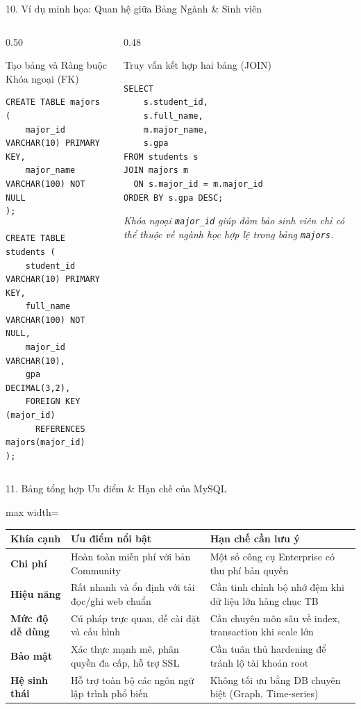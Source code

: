 \documentclass[aspectratio=169,11pt]{beamer}
\newcommand{\kw}[1]{\textcolor{dbblue}{\textbf{#1}}}
\begin{document}
\begin{frame}[fragile]{10. Ví dụ minh họa: Quan hệ giữa Bảng Ngành \& Sinh viên}
\begin{columns}[t]
  \begin{column}{0.50\textwidth}
    \begin{block}{Tạo bảng và Ràng buộc Khóa ngoại (FK)}
\begin{lstlisting}
CREATE TABLE majors (
    major_id VARCHAR(10) PRIMARY KEY,
    major_name VARCHAR(100) NOT NULL
);

CREATE TABLE students (
    student_id VARCHAR(10) PRIMARY KEY,
    full_name VARCHAR(100) NOT NULL,
    major_id VARCHAR(10),
    gpa DECIMAL(3,2),
    FOREIGN KEY (major_id) 
      REFERENCES majors(major_id)
);
\end{lstlisting}
    \end{block}
  \end{column}
  \begin{column}{0.48\textwidth}
    \begin{block}{Truy vấn kết hợp hai bảng (JOIN)}
\begin{lstlisting}
SELECT 
    s.student_id,
    s.full_name,
    m.major_name,
    s.gpa
FROM students s
JOIN majors m 
  ON s.major_id = m.major_id
ORDER BY s.gpa DESC;
\end{lstlisting}
    \end{block}
    \scriptsize
    \textit{Khóa ngoại \texttt{major\_id} giúp đảm bảo sinh viên chỉ có thể thuộc về ngành học hợp lệ trong bảng \texttt{majors}.}
  \end{column}
\end{columns}
\end{frame}

\begin{frame}{11. Bảng tổng hợp Ưu điểm \& Hạn chế của MySQL}
\centering
\begin{adjustbox}{max width=\textwidth}
\footnotesize
\begin{tabular}{p{2.6cm}p{5.8cm}p{5.8cm}}
\toprule
\textbf{Khía cạnh} & \textbf{Ưu điểm nổi bật} & \textbf{Hạn chế cần lưu ý} \\
\midrule
\kw{Chi phí} & Hoàn toàn miễn phí với bản Community & Một số công cụ Enterprise có thu phí bản quyền \\
\kw{Hiệu năng} & Rất nhanh và ổn định với tải đọc/ghi web chuẩn & Cần tinh chỉnh bộ nhớ đệm khi dữ liệu lớn hàng chục TB \\
\kw{Mức độ dễ dùng} & Cú pháp trực quan, dễ cài đặt và cấu hình & Cần chuyên môn sâu về index, transaction khi scale lớn \\
\kw{Bảo mật} & Xác thực mạnh mẽ, phân quyền đa cấp, hỗ trợ SSL & Cần tuân thủ hardening để tránh lộ tài khoản root \\
\kw{Hệ sinh thái} & Hỗ trợ toàn bộ các ngôn ngữ lập trình phổ biến & Không tối ưu bằng DB chuyên biệt (Graph, Time-series) \\
\bottomrule
\end{tabular}
\end{adjustbox}
\end{frame}
\end{document}
